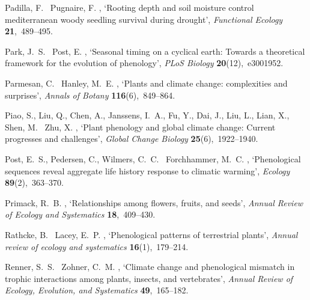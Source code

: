 \documentclass[11pt]{article}
\begin{document}
\begin{thebibliography}{xx}
Padilla, F. \harvardand\ Pugnaire, F.  \harvardyearright ,
  `Rooting depth and soil moisture control mediterranean woody seedling
  survival during drought', {\em Functional Ecology} {\bf 21},~489--495.

Park, J.~S. \harvardand\ Post, E.  \harvardyearright ,
  `Seasonal timing on a cyclical earth: Towards a theoretical framework for the
  evolution of phenology', {\em PLoS Biology} {\bf 20}(12),~e3001952.

Parmesan, C. \harvardand\ Hanley, M.~E.  \harvardyearright
  , `Plants and climate change: complexities and surprises', {\em Annals of
  Botany} {\bf 116}(6),~849--864.

Piao, S., Liu, Q., Chen, A., Janssens, I.~A., Fu, Y., Dai, J., Liu, L., Lian,
  X., Shen, M. \harvardand\ Zhu, X.  \harvardyearright ,
  `Plant phenology and global climate change: Current progresses and
  challenges', {\em Global Change Biology} {\bf 25}(6),~1922--1940.

Post, E.~S., Pedersen, C., Wilmers, C.~C. \harvardand\ Forchhammer, M.~C.
  \harvardyearleft 2008\harvardyearright , `Phenological sequences reveal
  aggregate life history response to climatic warming', {\em Ecology} {\bf
  89}(2),~363--370.

Primack, R.~B.  \harvardyearright , `Relationships among
  flowers, fruits, and seeds', {\em Annual Review of Ecology and Systematics}
  {\bf 18},~409--430.

Rathcke, B. \harvardand\ Lacey, E.~P.  \harvardyearleft 1985\harvardyearright ,
  `Phenological patterns of terrestrial plants', {\em Annual review of ecology
  and systematics} {\bf 16}(1),~179--214.

Renner, S.~S. \harvardand\ Zohner, C.~M.  \harvardyearright , `Climate change and phenological mismatch in trophic
  interactions among plants, insects, and vertebrates', {\em Annual Review of
  Ecology, Evolution, and Systematics} {\bf 49},~165--182.


\end{thebibliography}
\end{document}
